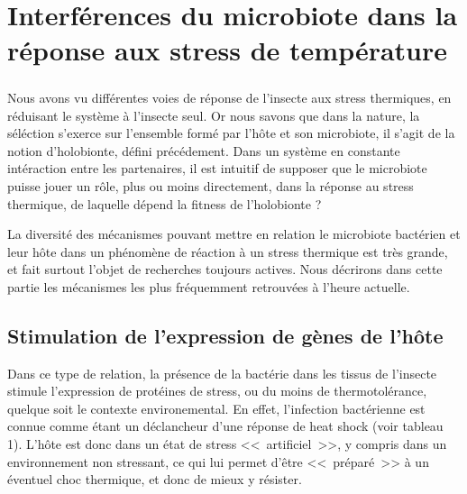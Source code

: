 \chapter{Interférences du microbiote dans la réponse aux stress de température} %

\paragraph{}
Nous avons vu différentes voies de réponse de l'insecte aux stress thermiques, en réduisant le système à l'insecte seul.
Or nous savons que dans la nature, la séléction s'exerce sur l'ensemble formé par l'hôte et son microbiote, il s'agit de la notion d'holobionte, défini précédement.
Dans un système en constante intéraction entre les partenaires, il est intuitif de supposer que le microbiote puisse jouer un rôle, plus ou moins directement, dans la réponse au stress thermique, de laquelle dépend la fitness de l'holobionte ?

La diversité des mécanismes pouvant mettre en relation le microbiote bactérien et leur hôte dans un phénomène de réaction à un stress thermique est très grande, et fait surtout l'objet de recherches toujours actives.
Nous décrirons dans cette partie les mécanismes les plus fréquemment retrouvées à l'heure actuelle.

\section{Stimulation de l'expression de gènes de l'hôte}

Dans ce type de relation, la présence de la bactérie dans les tissus de l'insecte stimule l'expression de protéines de stress, ou du moins de thermotolérance, quelque soit le contexte environemental.
En effet, l'infection bactérienne est connue comme étant un déclancheur d'une réponse de heat shock (voir tableau 1).
L'hôte est donc dans un état de stress <<~artificiel~>>, y compris dans un environnement non stressant, ce qui lui permet d'être <<~préparé~>> à un éventuel choc thermique, et donc de mieux y résister.

